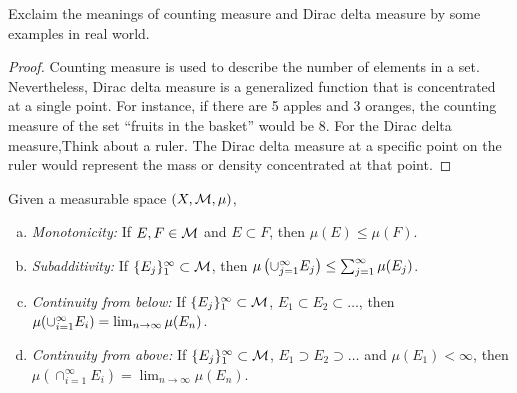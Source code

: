 \begin{exc}
    Exclaim the meanings of 
    counting measure and Dirac delta measure 
    by some examples in real world.
\end{exc}
\begin{proof}
    Counting measure is used to describe the number of elements in a set. 
    Nevertheless, Dirac delta measure is a generalized function that is concentrated at a single point.
    For instance, if there are 5 apples and 3 oranges, the counting measure of the set “fruits in the basket” would be 8.
    For the Dirac delta measure,Think about a ruler. The Dirac delta measure at a specific point on the ruler would 
    represent the mass or density concentrated at that point. 
\end{proof}
\begin{thm}
    \label{Thm:PropertiesOfMeasure}
    Given a measurable space $(X,\mathcal{M},\mu)$, 
    \begin{enumerate}[(a)]
        \item \textit{Monotonicity:} If $E,F\in\mathcal{M}$ and $E\subset F$, 
        then $\mu(E)\le\mu(F)$. 
        \item \textit{Subadditivity:} 
        If $\{E_{j}\}_{1}^{\infty}\subset\mathcal{M}$, 
        then $\mu\left(\cup_{j=1}^{\infty}E_j\right)\le\sum_{j=1}^{\infty}\mu(E_j)$.
        \item \textit{Continuity from below:} 
        If $\{E_j\}_{1}^{\infty}\subset\mathcal{M}$, 
        $E_1\subset E_2\subset\ldots$, then 
        $\mu(\cup_{i=1}^{\infty}E_{i})=\lim_{n\rightarrow\infty}\mu(E_n)$.
        \item \textit{Continuity from above:}
        If $\{E_j\}_{1}^{\infty}\subset\mathcal{M}$, 
        $E_1\supset E_2\supset\ldots$ and $\mu(E_{1})<\infty$, 
        then 
        $\mu(\cap_{i=1}^{\infty}E_{i})=\lim_{n\rightarrow\infty}\mu(E_n)$.
    \end{enumerate} 
\end{thm}
